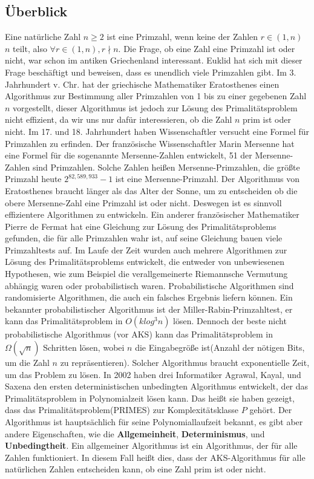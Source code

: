 \documentclass[12pt,oneside]{article}
\theoremstyle{remark}
\theoremstyle{definition}
\begin{document}
\subsection{Überblick}
Eine natürliche Zahl $n \geq 2$ ist eine Primzahl, wenn keine der Zahlen $r \in (1,n)$ $n$ teilt, also $\forall r \in (1,n), r \nmid n$. Die Frage, ob eine Zahl eine Primzahl ist oder nicht, war schon im antiken Griechenland interessant. Euklid hat sich mit dieser Frage beschäftigt und beweisen, dass es unendlich viele Primzahlen gibt. Im 3. Jahrhundert v. Chr. hat der griechische Mathematiker Eratosthenes einen Algorithmus zur Bestimmung aller Primzahlen von 1 bis zu einer gegebenen Zahl $n $ vorgestellt, dieser Algorithmus ist jedoch zur Lösung des Primalitätsproblem nicht effizient, da wir uns nur dafür interessieren, ob die Zahl $n$ prim ist oder nicht. Im 17. und 18. Jahrhundert haben Wissenschaftler versucht eine Formel für Primzahlen zu erfinden. Der französische Wissenschaftler Marin Mersenne hat eine Formel für die sogenannte Mersenne-Zahlen entwickelt, 51 der Mersenne-Zahlen sind Primzahlen. Solche Zahlen heißen Mersenne-Primzahlen, die größte Primzahl heute $2^{82,589,933} − 1$ ist eine Mersenne-Primzahl. Der Algorithmus von Eratosthenes braucht länger als das Alter der Sonne, um zu entscheiden ob die obere Mersenne-Zahl eine Primzahl ist oder nicht. Deswegen ist es sinnvoll effizientere Algorithmen zu entwickeln. Ein anderer französischer Mathematiker Pierre de Fermat hat eine Gleichung zur Lösung des Primalitätsproblems gefunden, die für alle Primzahlen wahr ist, auf seine Gleichung bauen viele Primzahltests auf. \newline\newline
Im Laufe der Zeit wurden auch mehrere Algorithmen zur Lösung des Primalitätsproblems entwickelt, die entweder von unbewiesenen Hypothesen, wie zum Beispiel die verallgemeinerte Riemannsche Vermutung abhängig waren oder probabilistisch waren. Probabilistische Algorithmen sind randomisierte Algorithmen, die auch ein falsches Ergebnis liefern können. Ein bekannter probabilistischer Algorithmus ist der Miller-Rabin-Primzahltest, er kann das Primalitätsproblem in $O(k log^3 n)$ lösen. Dennoch der beste nicht probabilistische Algorithmus (vor AKS) kann das Primalitätsproblem in $ \Omega(\sqrt{n}) $ Schritten lösen, wobei $n$ die Eingabegröße ist(Anzahl der nötigen Bits, um die Zahl $n$ zu repräsentieren). Solcher Algorithmus braucht exponentielle Zeit, um das Problem zu lösen. In 2002 haben drei Informatiker Agrawal, Kayal, und Saxena den ersten deterministischen unbedingten Algorithmus entwickelt, der das Primalitätsproblem in Polynomialzeit lösen kann. Das heißt sie haben gezeigt, dass das Primalitätsproblem(PRIMES) zur Komplexitätsklasse $P$ gehört. Der Algorithmus ist hauptsächlich für seine Polynomiallaufzeit bekannt, es gibt aber andere Eigenschaften, wie die \textbf{Allgemeinheit}, \textbf{Determinismus}, und \textbf{Unbedingtheit}. Ein allgemeiner Algorithmus ist ein Algorithmus, der für alle Zahlen funktioniert. In diesem Fall heißt dies, dass der AKS-Algorithmus für alle natürlichen Zahlen entscheiden kann, ob eine Zahl prim ist oder nicht.
\end{document}
